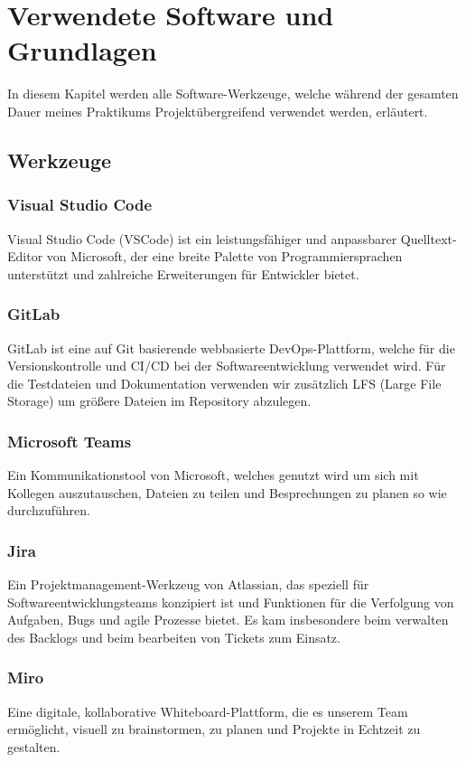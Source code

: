 \section{Verwendete Software und Grundlagen}
In diesem Kapitel werden alle Software-Werkzeuge, welche während der gesamten Dauer meines Praktikums Projektübergreifend
verwendet werden, erläutert.


\subsection{Werkzeuge}

\subsubsection{Visual Studio Code}
Visual Studio Code (VSCode) ist ein leistungsfähiger und anpassbarer Quelltext-Editor von Microsoft, der eine breite
Palette von Programmiersprachen unterstützt und zahlreiche Erweiterungen für Entwickler bietet. 

\subsubsection{GitLab}
GitLab ist eine auf Git basierende webbasierte DevOps-Plattform, welche für die Versionskontrolle und CI/CD bei der
Softwareentwicklung verwendet wird. Für die Testdateien und Dokumentation verwenden wir zusätzlich LFS (Large File
Storage) um größere Dateien im Repository abzulegen.

\subsubsection{Microsoft Teams}
Ein Kommunikationstool von Microsoft, welches genutzt wird um sich mit Kollegen auszutauschen, Dateien zu teilen und
Besprechungen zu planen so wie durchzuführen.

\subsubsection{Jira}
Ein Projektmanagement-Werkzeug von Atlassian, das speziell für Softwareentwicklungsteams konzipiert ist und Funktionen
für die Verfolgung von Aufgaben, Bugs und agile Prozesse bietet. Es kam insbesondere beim verwalten des Backlogs und
beim bearbeiten von Tickets zum Einsatz.

\subsubsection{Miro}
Eine digitale, kollaborative Whiteboard-Plattform, die es unserem Team ermöglicht, visuell zu brainstormen, zu planen
und Projekte in Echtzeit zu gestalten.
